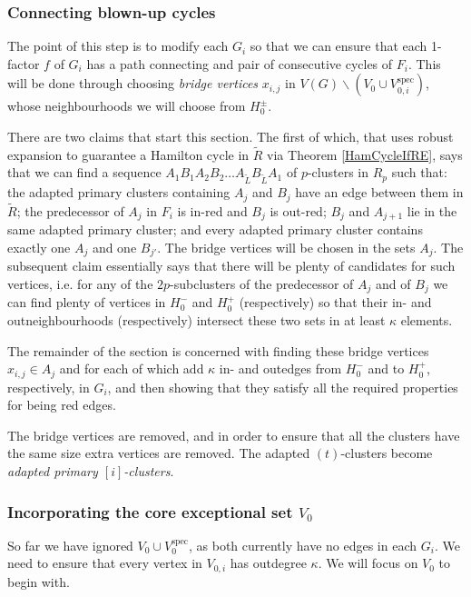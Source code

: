 \documentclass[10pt,letterpaper, reqno]{amsart}
\theoremstyle{definition}
\numberwithin{equation}{section}
\begin{document}
\subsubsection{Connecting blown-up cycles} The point of this step is to modify each $G_i$ so that we can ensure that each 1-factor $f$ of $G_i$ has a path connecting and pair of consecutive cycles of $F_i$. This will be done through choosing \textit{bridge vertices} $x_{i,j}$ in $V(G) \backslash (V_0 \cup V_{0,i}^\text{spec})$, whose neighbourhoods we will choose from $H_0^\pm$. 

There are two claims that start this section. The first of which, that uses robust expansion to guarantee a Hamilton cycle in $\tilde{R}$ via Theorem \ref{HamCycleIfRE}, says that we can find a sequence $A_1B_1A_2B_2\dots A_{\tilde{L}} B_{\tilde{L}}A_1$ of $p$-clusters in $R_p$ such that: the adapted primary clusters containing $A_j$ and $B_j$ have an edge between them in $\tilde{R}$; the predecessor of $A_j$ in $F_i$ is in-red and $B_j$ is out-red; $B_j$ and $A_{j+1}$ lie in the same adapted primary cluster; and every adapted primary cluster contains exactly one $A_j$ and one $B_{j'}$. The bridge vertices will be chosen in the sets $A_j$. The subsequent claim essentially says that there will be plenty of candidates for such vertices, i.e. for any of the  $2p$-subclusters of the predecessor of $A_j$ and of $B_j$ we can find plenty of vertices in $H_0^-$ and $H_0^+$ (respectively) so that their in- and outneighbourhoods (respectively) intersect these two sets in at least $\kappa$ elements. 

The remainder of the section is concerned with finding these bridge vertices $x_{i,j} \in A_j$ and for each of which add $\kappa$ in- and outedges from $H^-_0$ and to $H^+_0$, respectively, in $G_i$, and then showing that they satisfy all the required properties for being red edges. 

The bridge vertices are removed, and in order to ensure that all the clusters have the same size extra vertices are removed. The adapted $(t)$-clusters become \textit{adapted primary $[i]$-clusters}. 

\subsubsection{Incorporating the core exceptional set $V_0$} So far we have ignored $V_0 \cup V_0^\text{spec}$, as both currently have no edges in each $G_i$. We need to ensure that every vertex in $V_{0,i}$ has outdegree $\kappa$. We will focus on $V_0$ to begin with. 
\end{document}
